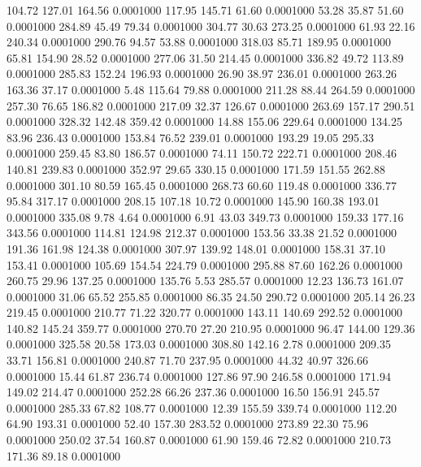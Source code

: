  104.72  127.01  164.56   0.0001000
 117.95  145.71   61.60   0.0001000
  53.28   35.87   51.60   0.0001000
 284.89   45.49   79.34   0.0001000
 304.77   30.63  273.25   0.0001000
  61.93   22.16  240.34   0.0001000
 290.76   94.57   53.88   0.0001000
 318.03   85.71  189.95   0.0001000
  65.81  154.90   28.52   0.0001000
 277.06   31.50  214.45   0.0001000
 336.82   49.72  113.89   0.0001000
 285.83  152.24  196.93   0.0001000
  26.90   38.97  236.01   0.0001000
 263.26  163.36   37.17   0.0001000
   5.48  115.64   79.88   0.0001000
 211.28   88.44  264.59   0.0001000
 257.30   76.65  186.82   0.0001000
 217.09   32.37  126.67   0.0001000
 263.69  157.17  290.51   0.0001000
 328.32  142.48  359.42   0.0001000
  14.88  155.06  229.64   0.0001000
 134.25   83.96  236.43   0.0001000
 153.84   76.52  239.01   0.0001000
 193.29   19.05  295.33   0.0001000
 259.45   83.80  186.57   0.0001000
  74.11  150.72  222.71   0.0001000
 208.46  140.81  239.83   0.0001000
 352.97   29.65  330.15   0.0001000
 171.59  151.55  262.88   0.0001000
 301.10   80.59  165.45   0.0001000
 268.73   60.60  119.48   0.0001000
 336.77   95.84  317.17   0.0001000
 208.15  107.18   10.72   0.0001000
 145.90  160.38  193.01   0.0001000
 335.08    9.78    4.64   0.0001000
   6.91   43.03  349.73   0.0001000
 159.33  177.16  343.56   0.0001000
 114.81  124.98  212.37   0.0001000
 153.56   33.38   21.52   0.0001000
 191.36  161.98  124.38   0.0001000
 307.97  139.92  148.01   0.0001000
 158.31   37.10  153.41   0.0001000
 105.69  154.54  224.79   0.0001000
 295.88   87.60  162.26   0.0001000
 260.75   29.96  137.25   0.0001000
 135.76    5.53  285.57   0.0001000
  12.23  136.73  161.07   0.0001000
  31.06   65.52  255.85   0.0001000
  86.35   24.50  290.72   0.0001000
 205.14   26.23  219.45   0.0001000
 210.77   71.22  320.77   0.0001000
 143.11  140.69  292.52   0.0001000
 140.82  145.24  359.77   0.0001000
 270.70   27.20  210.95   0.0001000
  96.47  144.00  129.36   0.0001000
 325.58   20.58  173.03   0.0001000
 308.80  142.16    2.78   0.0001000
 209.35   33.71  156.81   0.0001000
 240.87   71.70  237.95   0.0001000
  44.32   40.97  326.66   0.0001000
  15.44   61.87  236.74   0.0001000
 127.86   97.90  246.58   0.0001000
 171.94  149.02  214.47   0.0001000
 252.28   66.26  237.36   0.0001000
  16.50  156.91  245.57   0.0001000
 285.33   67.82  108.77   0.0001000
  12.39  155.59  339.74   0.0001000
 112.20   64.90  193.31   0.0001000
  52.40  157.30  283.52   0.0001000
 273.89   22.30   75.96   0.0001000
 250.02   37.54  160.87   0.0001000
  61.90  159.46   72.82   0.0001000
 210.73  171.36   89.18   0.0001000
